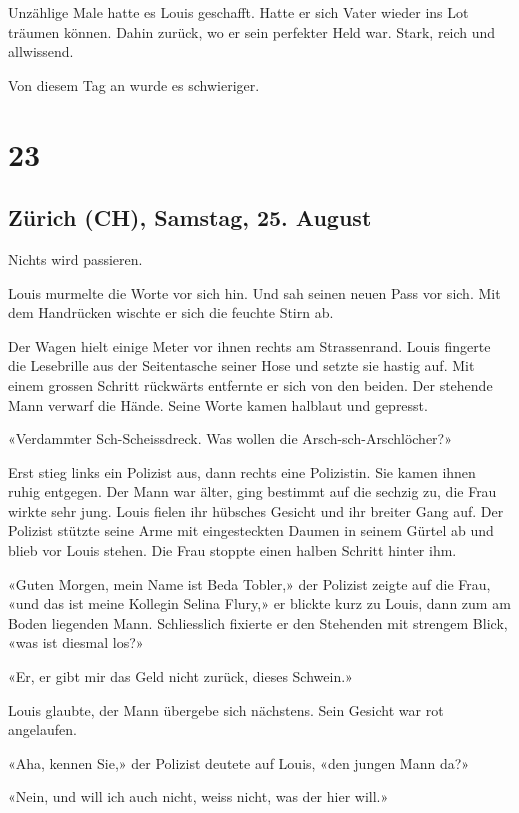 Unzählige Male hatte es Louis geschafft. Hatte er sich Vater wieder ins
Lot träumen können. Dahin zurück, wo er sein perfekter Held war. Stark,
reich und allwissend.

Von diesem Tag an wurde es schwieriger.

\chapter{23}\label{section-22}

\section{Zürich (CH), Samstag, 25.
August}\label{zuxfcrich-ch-samstag-25.-august}

Nichts wird passieren.

Louis murmelte die Worte vor sich hin. Und sah seinen neuen Pass vor
sich. Mit dem Handrücken wischte er sich die feuchte Stirn ab.

Der Wagen hielt einige Meter vor ihnen rechts am Strassenrand. Louis
fingerte die Lesebrille aus der Seitentasche seiner Hose und setzte sie
hastig auf. Mit einem grossen Schritt rückwärts entfernte er sich von
den beiden. Der stehende Mann verwarf die Hände. Seine Worte kamen
halblaut und gepresst.

«Verdammter Sch-Scheissdreck. Was wollen die Arsch-sch-Arschlöcher?»

Erst stieg links ein Polizist aus, dann rechts eine Polizistin. Sie
kamen ihnen ruhig entgegen. Der Mann war älter, ging bestimmt auf die
sechzig zu, die Frau wirkte sehr jung. Louis fielen ihr hübsches Gesicht
und ihr breiter Gang auf. Der Polizist stützte seine Arme mit
eingesteckten Daumen in seinem Gürtel ab und blieb vor Louis stehen. Die
Frau stoppte einen halben Schritt hinter ihm.

«Guten Morgen, mein Name ist Beda Tobler,» der Polizist zeigte auf die
Frau, «und das ist meine Kollegin Selina Flury,» er blickte kurz zu
Louis, dann zum am Boden liegenden Mann. Schliesslich fixierte er den
Stehenden mit strengem Blick, «was ist diesmal los?»

«Er, er gibt mir das Geld nicht zurück, dieses Schwein.»

Louis glaubte, der Mann übergebe sich nächstens. Sein Gesicht war rot
angelaufen.

«Aha, kennen Sie,» der Polizist deutete auf Louis, «den jungen Mann da?»

«Nein, und will ich auch nicht, weiss nicht, was der hier will.»

